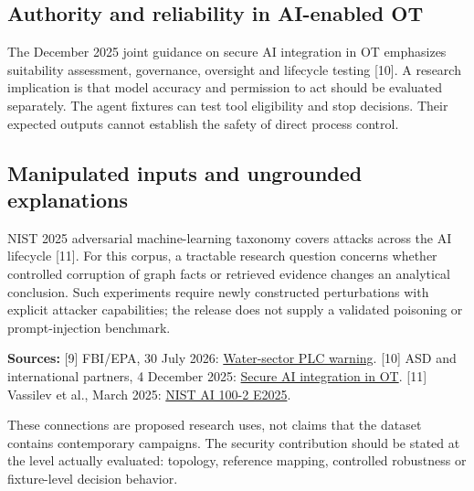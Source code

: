 \subsection*{Authority and reliability in AI-enabled OT}
The December 2025 joint guidance on secure AI integration in OT emphasizes suitability assessment, governance, oversight and lifecycle testing [10]. A research implication is that model accuracy and permission to act should be evaluated separately. The agent fixtures can test tool eligibility and stop decisions. Their expected outputs cannot establish the safety of direct process control.

\subsection*{Manipulated inputs and ungrounded explanations}
NIST 2025 adversarial machine-learning taxonomy covers attacks across the AI lifecycle [11]. For this corpus, a tractable research question concerns whether controlled corruption of graph facts or retrieved evidence changes an analytical conclusion. Such experiments require newly constructed perturbations with explicit attacker capabilities; the release does not supply a validated poisoning or prompt-injection benchmark.

\textbf{Sources:} [9] FBI/EPA, 30 July 2026: \href{https://www.fbi.gov/investigate/cyber/alerts/2026/malicious-cyber-actors-targeting-water-and-wastewater-sector-internet--facing-programmable-logic-controllers-causing-operational-disruptions}{Water-sector PLC warning}. [10] ASD and international partners, 4 December 2025: \href{https://www.cyber.gov.au/publication/principles-for-the-secure-integration-of-artificial-intelligence-in-operational-technology}{Secure AI integration in OT}. [11] Vassilev et al., March 2025: \href{https://doi.org/10.6028/NIST.AI.100-2e2025}{NIST AI 100-2 E2025}. 

These connections are proposed research uses, not claims that the dataset contains contemporary campaigns. The security contribution should be stated at the level actually evaluated: topology, reference mapping, controlled robustness or fixture-level decision behavior.

